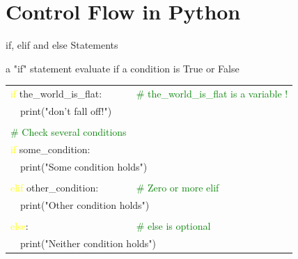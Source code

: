 \documentclass[serif, aspectratio=169]{beamer}
\newcommand{\tgreen}[1]{\textcolor{green}{#1}}
\newcommand{\tyellow}[1]{\textcolor{yellow}{#1}}
\newcommand{\tpurple}[1]{\textcolor{purple!50}{#1}}
\newenvironment{CLI} %
    {
    \noindent
    \ttfamily 
    \footnotesize
    \begin{tcolorbox}[colback=gray!150,colframe=black]
    \color{white}
    \begin{tabular}{p{4.5cm}p{7.5cm}}
    }
    { 
    \end{tabular}
    \end{tcolorbox}
    }
\begin{document}
\section{Control Flow in Python}

\begin{frame}{if, elif and else Statements}
    \begin{block}{a "if" statement evaluate if a condition is True or False}
        \vspace{2pt}
        \begin{CLI}
            \tyellow{if} the\_world\_is\_flat: & \tgreen{\# the\_world\_is\_flat is a variable !} \\
            ~~\tpurple{print}("don't fall off!") & \\
            \pause
            & \\
            \tgreen{\# Check several conditions} & \\
            \tyellow{if} some\_condition: & \\
            \multicolumn{2}{l}{~~print("Some condition holds")} \\
            \pause
            & \\
            \tyellow{elif} other\_condition: & \tgreen{\# Zero or more elif} \\
            \multicolumn{2}{l}{~~print("Other condition holds")} \\
            \pause
            & \\
            \tyellow{else}: & \tgreen{\# else is optional} \\
            \multicolumn{2}{l}{~~print("Neither condition holds")} \\
        \end{CLI}
    \end{block} 
\end{frame}
\end{document}
